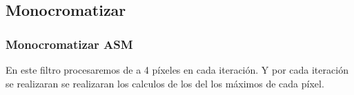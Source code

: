 \subsection{Monocromatizar}




			  
			  
			  
			  
			  
			  
			
			  




\subsubsection*{Monocromatizar ASM}

En este filtro procesaremos de a 4 píxeles en cada iteración. %
Y por cada iteración se realizaran se realizaran los calculos de los del los máximos de cada píxel.

